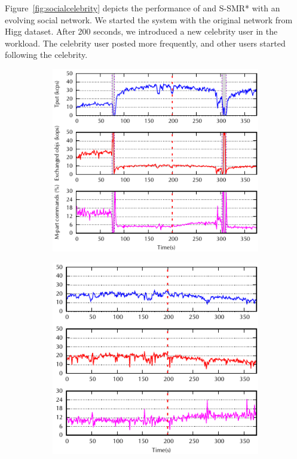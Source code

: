 Figure~\ref{fig:socialcelebrity} depicts the performance of \dynastar and S-SMR*
with an evolving social network. We started the system with the original network
from Higg dataset. After 200 seconds, we introduced a new celebrity user in the
workload. The celebrity user posted more frequently, and other users started
following the celebrity.
\begin{figure}[ht!]
  \centering
  \begin{subfigure}{.48\textwidth}
    \centering
    \includegraphics[width=\textwidth]{./figures/experiments/dynastar/chirper-celeb-dynastar-no-oracle.pdf}
    \caption{}
  \end{subfigure}
  \begin{subfigure}{.48\textwidth}
    \centering
    \includegraphics[width=\textwidth]{./figures/experiments/dynastar/chirper-celeb-ssmr.pdf}

\end{subfigure}
\end{figure}

